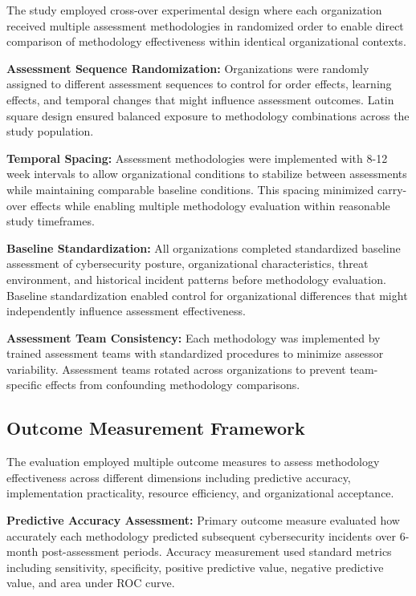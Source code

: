 \documentclass[10pt, twocolumn]{article}
\begin{document}
The study employed cross-over experimental design where each organization received multiple assessment methodologies in randomized order to enable direct comparison of methodology effectiveness within identical organizational contexts.

\textbf{Assessment Sequence Randomization:} Organizations were randomly assigned to different assessment sequences to control for order effects, learning effects, and temporal changes that might influence assessment outcomes. Latin square design ensured balanced exposure to methodology combinations across the study population.

\textbf{Temporal Spacing:} Assessment methodologies were implemented with 8-12 week intervals to allow organizational conditions to stabilize between assessments while maintaining comparable baseline conditions. This spacing minimized carry-over effects while enabling multiple methodology evaluation within reasonable study timeframes.

\textbf{Baseline Standardization:} All organizations completed standardized baseline assessment of cybersecurity posture, organizational characteristics, threat environment, and historical incident patterns before methodology evaluation. Baseline standardization enabled control for organizational differences that might independently influence assessment effectiveness.

\textbf{Assessment Team Consistency:} Each methodology was implemented by trained assessment teams with standardized procedures to minimize assessor variability. Assessment teams rotated across organizations to prevent team-specific effects from confounding methodology comparisons.

\subsection{Outcome Measurement Framework}

The evaluation employed multiple outcome measures to assess methodology effectiveness across different dimensions including predictive accuracy, implementation practicality, resource efficiency, and organizational acceptance.

\textbf{Predictive Accuracy Assessment:} Primary outcome measure evaluated how accurately each methodology predicted subsequent cybersecurity incidents over 6-month post-assessment periods. Accuracy measurement used standard metrics including sensitivity, specificity, positive predictive value, negative predictive value, and area under ROC curve.
\end{document}
